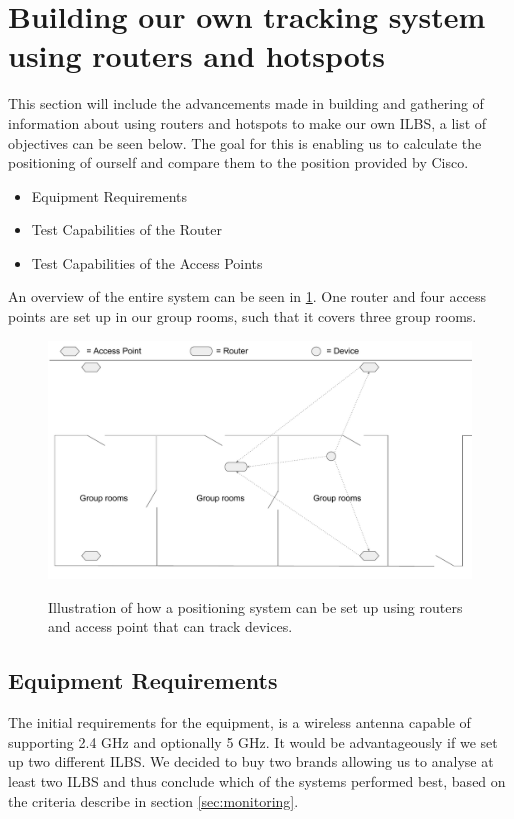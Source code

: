 \section{Building our own tracking system using routers and hotspots}
This section will include the advancements made in building and gathering of information about using routers and hotspots to make our own ILBS, a list of objectives can be seen below. The goal for this is enabling us to calculate the positioning of ourself and compare them to the position provided by Cisco.

\begin{itemize}
	\item Equipment Requirements
	\item Test Capabilities of the Router 
	\item Test Capabilities of the Access Points
\end{itemize}

An overview of the entire system can be seen in \cref{fig:OwnSetup}. One router and four access points are set up in our group rooms, such that it covers three group rooms.
\begin{figure}[H]
	\centering
	\includegraphics[scale=0.5]{graphics/Router-AccessPoint_Setup.pdf}
	\label{fig:OwnSetup}
	\caption{Illustration of how a positioning system can be set up using routers and access point that can track devices. }
\end{figure}

\subsection*{Equipment Requirements}
The initial requirements for the equipment, is a wireless antenna capable of supporting 2.4 GHz and optionally 5 GHz. It would be advantageously if we set up two different ILBS. We decided to buy two brands allowing us to analyse at least two ILBS and thus conclude which of the systems performed best, based on the criteria describe in section \ref{sec:monitoring}.


